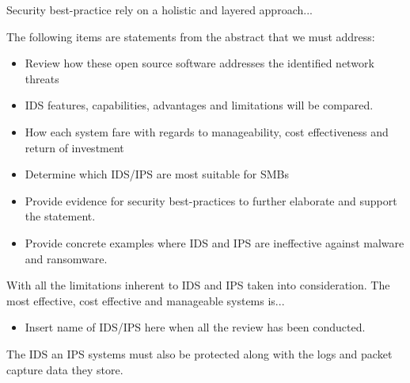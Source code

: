 Security best-practice rely on a holistic and layered approach...

\begin{followup}
    The following items are statements from the abstract that we must address:
    
    \begin{itemize}
        \item Review how these open source software addresses the identified network threats
        \item IDS features, capabilities, advantages and limitations will be compared.
        \item How each system fare with regards to manageability, cost effectiveness and return of investment
        \item Determine which IDS/IPS are most suitable for SMBs
    \end{itemize}
    
\end{followup}


\begin{followup}[to-do]
    \begin{itemize}
        \item Provide evidence for security best-practices to further elaborate and support the statement.
        \item Provide concrete examples where IDS and IPS are ineffective against malware and ransomware.
    \end{itemize}
\end{followup}

With all the limitations inherent to IDS and IPS taken into consideration. The most effective, cost effective and manageable systems is...

\begin{followup}[to-do]
    \begin{itemize}
        \item Insert name of IDS/IPS here when all the review has been conducted.
    \end{itemize}
\end{followup}


The IDS an IPS systems must also be protected along with the logs and packet capture data they store.